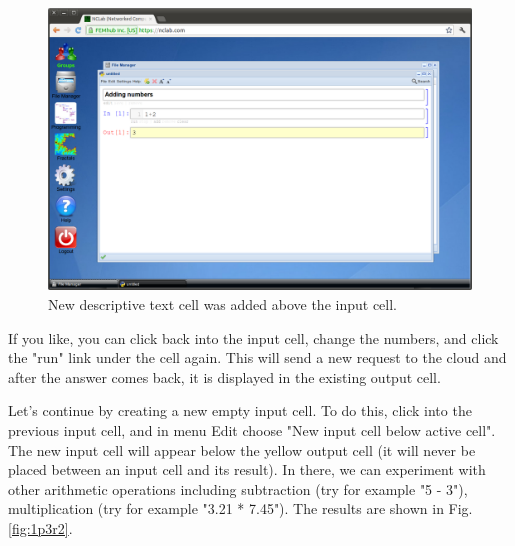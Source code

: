 \documentclass[article,A4,12pt]{llncs}
\begin{document}
\newpage
\begin{figure}[!ht]
\begin{center}
\includegraphics[width=\textwidth]{img/1p3r.png}
\end{center}
\caption{New descriptive text cell was added above the input cell.}
\label{fig:1p3r}
\end{figure}
\noindent
\noindent
If you like, you can click back into the input cell, change 
the numbers, and click the "run" link under the cell again. 
This will send a new request to the cloud and after the answer 
comes back, it is displayed in the existing output 
cell. 

Let's continue by creating a new empty input cell. To do this, click
into the previous input cell, and in menu Edit choose "New input cell 
below active cell". The new input cell will appear below the yellow 
output cell (it will never be placed between an input cell and its 
result). In there, we can experiment with other arithmetic operations 
including subtraction (try for example "5 - 3"), multiplication 
(try for example "3.21 * 7.45"). The results are shown in Fig. \ref{fig:1p3r2}.
\end{document}

